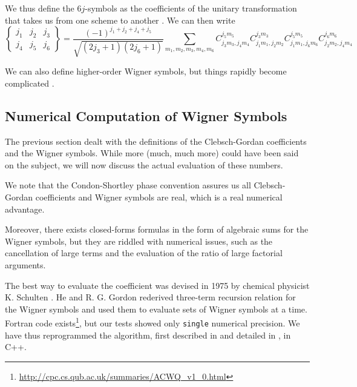 We thus define the $6j$-symbols as the coefficients of the unitary
transformation that takes us from one scheme to another \cite{VAR1988}.
We can then write
  \begin{equation}
   \begin{Bmatrix} j_1 & j_2 & j_3 \\ j_4 & j_5 & j_6 \end{Bmatrix} = \frac{(-1)^{j_1+j_2+j_4+j_5}}{\sqrt{(2j_3+1)(2j_6+1)}}
      \sum_{m_1,m_2,m_3,m_4,m_6} C_{j_3m_3,j_4m_4}^{j_5m_5}C_{j_1m_1,j_2m_2}^{j_3m_3}C_{j_1m_1,j_6m_6}^{j_5m_5}C_{j_2m_2,j_4m_4}^{j_6m_6}
  \end{equation}


We can also define higher-order Wigner symbols, but things rapidly become complicated \cite{YUT1962}. 

\subsection{Numerical Computation of Wigner Symbols}
The previous section dealt with the definitions of 
the Clebsch-Gordan coefficients and the Wigner symbols. 
While more (much, much more) could have been said on the
subject, we will now discuss the actual evaluation of these
numbers. 

We note that the Condon-Shortley phase convention 
assures us all Clebsch-Gordan coefficients and 
Wigner symbols are real, which is a real numerical
advantage. 

Moreover, there exists closed-forms formulas in the form of algebraic
sums for the Wigner symbols, but they are riddled with numerical 
issues, such as the cancellation of large terms and the evaluation 
of the ratio of large factorial arguments. 

The best way to evaluate the coefficient was devised in 1975
by chemical physicist K. Schulten \cite{SCH1975}. 
He and R. G. Gordon 
rederived three-term recursion relation for the Wigner symbols 
and used them to evaluate sets of Wigner symbols at a time.
Fortran 
code exists\footnote{\url{http://cpc.cs.qub.ac.uk/summaries/ACWQ_v1_0.html}}, 
but our tests showed only \texttt{single} numerical precision. We have
thus reprogrammed the algorithm, first described in \cite{SCH1975}
and detailed in \cite{SCH1976}, in C++. 

